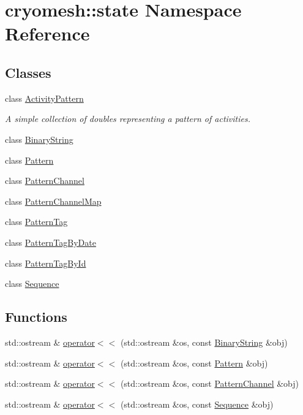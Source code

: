 \hypertarget{namespacecryomesh_1_1state}{\section{cryomesh\-:\-:state \-Namespace \-Reference}
\label{namespacecryomesh_1_1state}
}
\subsection*{\-Classes}
\begin{DoxyCompactItemize}
\item 
class \hyperlink{classcryomesh_1_1state_1_1ActivityPattern}{\-Activity\-Pattern}
\begin{DoxyCompactList}\small\item\em \-A simple collection of doubles representing a pattern of activities. \end{DoxyCompactList}\item 
class \hyperlink{classcryomesh_1_1state_1_1BinaryString}{\-Binary\-String}
\item 
class \hyperlink{classcryomesh_1_1state_1_1Pattern}{\-Pattern}
\item 
class \hyperlink{classcryomesh_1_1state_1_1PatternChannel}{\-Pattern\-Channel}
\item 
class \hyperlink{classcryomesh_1_1state_1_1PatternChannelMap}{\-Pattern\-Channel\-Map}
\item 
class \hyperlink{classcryomesh_1_1state_1_1PatternTag}{\-Pattern\-Tag}
\item 
class \hyperlink{classcryomesh_1_1state_1_1PatternTagByDate}{\-Pattern\-Tag\-By\-Date}
\item 
class \hyperlink{classcryomesh_1_1state_1_1PatternTagById}{\-Pattern\-Tag\-By\-Id}
\item 
class \hyperlink{classcryomesh_1_1state_1_1Sequence}{\-Sequence}
\end{DoxyCompactItemize}
\subsection*{\-Functions}
\begin{DoxyCompactItemize}
\item 
std\-::ostream \& \hyperlink{namespacecryomesh_1_1state_a54d53f52ec3e1e98328d2d4f3cdca7f3}{operator$<$$<$} (std\-::ostream \&os, const \hyperlink{classcryomesh_1_1state_1_1BinaryString}{\-Binary\-String} \&obj)
\item 
std\-::ostream \& \hyperlink{namespacecryomesh_1_1state_a4aff02398f935be1e18f400defe8bf10}{operator$<$$<$} (std\-::ostream \&os, const \hyperlink{classcryomesh_1_1state_1_1Pattern}{\-Pattern} \&obj)
\item 
std\-::ostream \& \hyperlink{namespacecryomesh_1_1state_aed7fe7e15b9a343b2b256cc8cc983178}{operator$<$$<$} (std\-::ostream \&os, const \hyperlink{classcryomesh_1_1state_1_1PatternChannel}{\-Pattern\-Channel} \&obj)
\item 
std\-::ostream \& \hyperlink{namespacecryomesh_1_1state_a8868c2c91eb672e03fe69328c04eea19}{operator$<$$<$} (std\-::ostream \&os, const \hyperlink{classcryomesh_1_1state_1_1Sequence}{\-Sequence} \&obj)
\end{DoxyCompactItemize}


